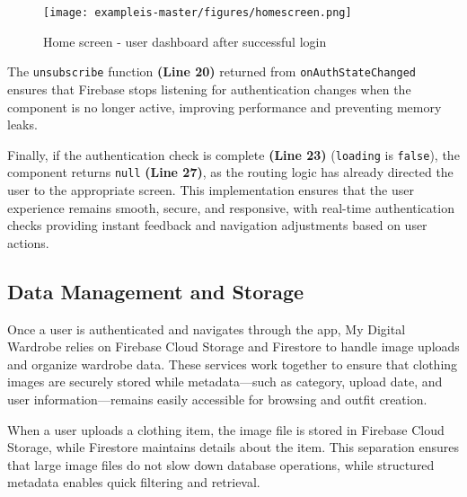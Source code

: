 \begin{figure}[h]
    \centering
    \texttt{[image: exampleis-master/figures/homescreen.png]}
    \caption{Home screen - user dashboard after successful login}
    \label{fig:home}
\end{figure}


The \texttt{unsubscribe} function \textbf{(Line 20)} returned from \texttt{onAuthStateChanged} ensures that Firebase stops listening for authentication changes when the component is no longer active, improving performance and preventing memory leaks.

Finally, if the authentication check is complete \textbf{(Line 23)} (\texttt{loading} is \texttt{false}), the component returns \texttt{null} \textbf{(Line 27)}, as the routing logic has already directed the user to the appropriate screen. This implementation ensures that the user experience remains smooth, secure, and responsive, with real-time authentication checks providing instant feedback and navigation adjustments based on user actions.


\subsection{Data Management and Storage}
Once a user is authenticated and navigates through the app, My Digital Wardrobe relies on Firebase Cloud Storage and Firestore to handle image uploads and organize wardrobe data. These services work together to ensure that clothing images are securely stored while metadata—such as category, upload date, and user information—remains easily accessible for browsing and outfit creation.

When a user uploads a clothing item, the image file is stored in Firebase Cloud Storage, while Firestore maintains details about the item. This separation ensures that large image files do not slow down database operations, while structured metadata enables quick filtering and retrieval.

